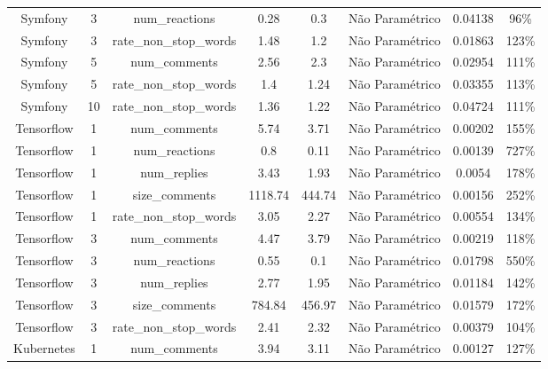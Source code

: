 \documentclass[12pt,openany,oneside,a4paper,english,brazil]{abntbibufjf}
\begin{document}
\begin{table}[htbp]
{\begin{tabular}{|c|c|c|c|c|c|c|c|}
Symfony    & 3  & num\_reactions         & 0.28               & 0.3                    & Não Paramétrico & 0.04138 & 96\%      \\
Symfony    & 3  & rate\_non\_stop\_words & 1.48               & 1.2                    & Não Paramétrico & 0.01863 & 123\%     \\
Symfony    & 5  & num\_comments          & 2.56               & 2.3                    & Não Paramétrico & 0.02954 & 111\%     \\
Symfony    & 5  & rate\_non\_stop\_words & 1.4                & 1.24                   & Não Paramétrico & 0.03355 & 113\%     \\
Symfony    & 10 & rate\_non\_stop\_words & 1.36               & 1.22                   & Não Paramétrico & 0.04724 & 111\%     \\
Tensorflow & 1  & num\_comments          & 5.74               & 3.71                   & Não Paramétrico & 0.00202 & 155\%     \\
Tensorflow & 1  & num\_reactions         & 0.8                & 0.11                   & Não Paramétrico & 0.00139 & 727\%     \\
Tensorflow & 1  & num\_replies           & 3.43               & 1.93                   & Não Paramétrico & 0.0054  & 178\%     \\
Tensorflow & 1  & size\_comments         & 1118.74            & 444.74                 & Não Paramétrico & 0.00156 & 252\%     \\
Tensorflow & 1  & rate\_non\_stop\_words & 3.05               & 2.27                   & Não Paramétrico & 0.00554 & 134\%     \\
Tensorflow & 3  & num\_comments          & 4.47               & 3.79                   & Não Paramétrico & 0.00219 & 118\%     \\
Tensorflow & 3  & num\_reactions         & 0.55               & 0.1                    & Não Paramétrico & 0.01798 & 550\%     \\
Tensorflow & 3  & num\_replies           & 2.77               & 1.95                   & Não Paramétrico & 0.01184 & 142\%     \\
Tensorflow & 3  & size\_comments         & 784.84             & 456.97                 & Não Paramétrico & 0.01579 & 172\%     \\
Tensorflow & 3  & rate\_non\_stop\_words & 2.41               & 2.32                   & Não Paramétrico & 0.00379 & 104\%     \\
Kubernetes & 1  & num\_comments          & 3.94               & 3.11                   & Não Paramétrico & 0.00127 & 127\%     \\

\end{tabular}}
\end{table}
\end{document}

